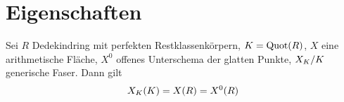 \documentclass[german]{scrreprt}
\begin{document}
\section{Eigenschaften}
\begin{Satz}\label{thm:ratpkteregulaeremodelle}
  Sei $R$ Dedekindring
  mit perfekten Restklassenkörpern,
  $K=\operatorname{Quot}(R)$,
  $X$ eine arithmetische Fläche,
  $X^0$ offenes Unterschema der glatten Punkte,
  $X_{K}/K$ generische Faser.
  Dann gilt
  \begin{gather*}
    X_{K}(K)=X(R)=X^0(R)
  \end{gather*}


\end{Satz}
\end{document}
